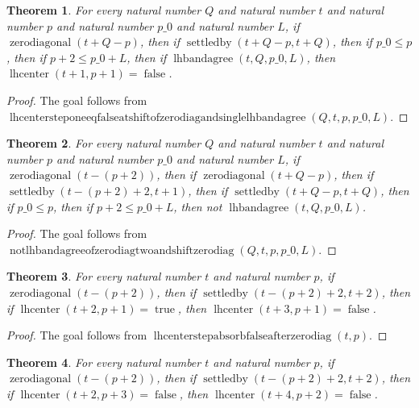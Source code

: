 \documentclass[11pt]{article}
\newtheorem{theorem}{Theorem}[section]
\theoremstyle{definition}
\begin{document}
\begin{theorem}
\label{ll:paper:lhcenter-step-one-eq-false-at-shift-of-zero-diag-and-single-lhbandagree}
For every natural number \(Q\) and natural number \(t\) and natural number \(p\) and natural number \(p\_0\) and natural number \(L\), if \(\operatorname{zerodiagonal}(t + Q - p)\), then if \(\operatorname{settledby}(t + Q - p, t + Q)\), then if \(p\_0 \le p\), then if \(p + 2 \le p\_0 + L\), then if \(\operatorname{lhbandagree}(t, Q, p\_0, L)\), then \(\operatorname{lhcenter}(t + 1, p + 1) = \operatorname{false}\).
\end{theorem}
\begin{proof}
The goal follows from \(\operatorname{lhcentersteponeeqfalseatshiftofzerodiagandsinglelhbandagree}(Q, t, p, p\_0, L)\).
\end{proof}
\begin{theorem}
\label{ll:paper:not-lhbandagree-of-zero-diag-two-and-shift-zero-diag}
For every natural number \(Q\) and natural number \(t\) and natural number \(p\) and natural number \(p\_0\) and natural number \(L\), if \(\operatorname{zerodiagonal}(t - (p + 2))\), then if \(\operatorname{zerodiagonal}(t + Q - p)\), then if \(\operatorname{settledby}(t - (p + 2) + 2, t + 1)\), then if \(\operatorname{settledby}(t + Q - p, t + Q)\), then if \(p\_0 \le p\), then if \(p + 2 \le p\_0 + L\), then not \(\operatorname{lhbandagree}(t, Q, p\_0, L)\).
\end{theorem}
\begin{proof}
The goal follows from \(\operatorname{notlhbandagreeofzerodiagtwoandshiftzerodiag}(Q, t, p, p\_0, L)\).
\end{proof}
\begin{theorem}
\label{ll:paper:lhcenter-step-absorb-false-after-zero-diag}
For every natural number \(t\) and natural number \(p\), if \(\operatorname{zerodiagonal}(t - (p + 2))\), then if \(\operatorname{settledby}(t - (p + 2) + 2, t + 2)\), then if \(\operatorname{lhcenter}(t + 2, p + 1) = \operatorname{true}\), then \(\operatorname{lhcenter}(t + 3, p + 1) = \operatorname{false}\).
\end{theorem}
\begin{proof}
The goal follows from \(\operatorname{lhcenterstepabsorbfalseafterzerodiag}(t, p)\).
\end{proof}
\begin{theorem}
\label{ll:paper:lhcenter-two-step-absorb-false-after-zero-diag}
For every natural number \(t\) and natural number \(p\), if \(\operatorname{zerodiagonal}(t - (p + 2))\), then if \(\operatorname{settledby}(t - (p + 2) + 2, t + 2)\), then if \(\operatorname{lhcenter}(t + 2, p + 3) = \operatorname{false}\), then \(\operatorname{lhcenter}(t + 4, p + 2) = \operatorname{false}\).
\end{theorem}
\end{document}
